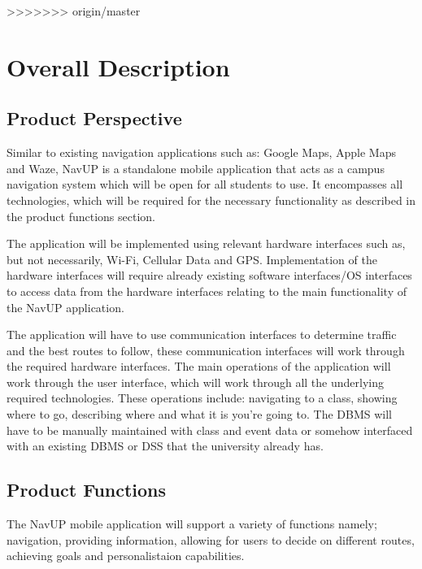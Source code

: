 \documentclass[11pt,a4paper]{article}
\begin{document}
		
>>>>>>> origin/master

\newpage
\section{Overall Description}
	\subsection{Product Perspective}
	Similar to existing navigation applications such as: Google Maps, Apple Maps and Waze, NavUP is a standalone mobile application that acts as a campus navigation system which will be open for all students to use. It encompasses all technologies, which will be required for the necessary functionality as described in the product functions section. 
\\
\par
The application will be implemented using relevant hardware interfaces such as, but not necessarily, Wi-Fi, Cellular Data and GPS. Implementation of the hardware interfaces will require already existing software interfaces/OS interfaces to access data from the hardware interfaces relating to the main functionality of the NavUP application. 
\\
\par
The application will have to use communication interfaces to determine traffic and the best routes to follow, these communication interfaces will work through the required hardware interfaces. The main operations of the application will work through the user interface, which will work through all the underlying required technologies. These operations include: navigating to a class, showing where to go, describing where and what it is you’re going to. The DBMS will have to be manually maintained with class and event data or somehow interfaced with an existing DBMS or DSS that the university already has. 

	\subsection{Product Functions}
	The NavUP mobile application will support a variety of functions namely; navigation, providing information, allowing for users to decide on different routes, achieving goals and personalistaion capabilities.
	\\
\end{document}
